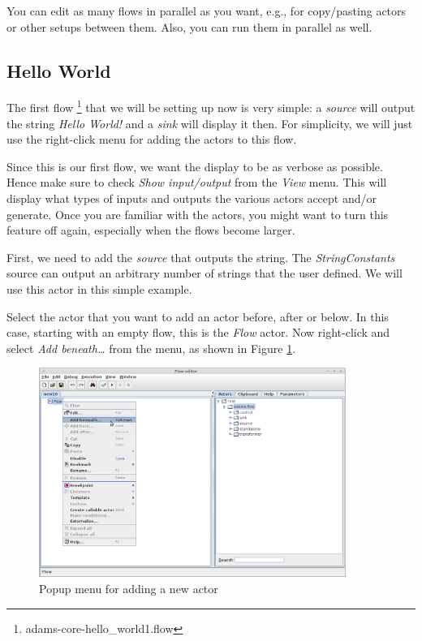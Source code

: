 You can edit as many flows in parallel as you want, e.g., for copy/pasting
actors or other setups between them. Also, you can run them in parallel as well.

\clearpage
\subsection{Hello World}
The first flow \footnote{adams-core-hello\_world1.flow} that we will be setting
up now is very simple: a \textit{source} will output the string \textit{Hello World!} and a \textit{sink} will display
it then. For simplicity, we will just use the right-click menu for adding the
actors to this flow.

Since this is our first flow, we want the display to be as
verbose as possible. Hence make sure to check \textit{Show input/output} from
the \textit{View} menu. This will display what types of inputs and outputs the
various actors accept and/or generate. Once you are familiar with the actors,
you might want to turn this feature off again, especially when the flows become
larger.

First, we need to add the \textit{source} that outputs the string. The
\textit{StringConstants} source can output an arbitrary number of strings that
the user defined. We will use this actor in this simple example.

Select the actor that you want to add an actor before, after or
below. In this case, starting with an empty flow, this is the
\textit{Flow} actor. Now right-click and select \textit{Add beneath\ldots} from
the menu, as shown in Figure \ref{floweditor-helloworld-addactor1}.

\begin{figure}[htb]
  \centering
  \includegraphics[width=10.0cm]{images/floweditor-helloworld-addactor1.png}
  \caption{Popup menu for adding a new actor}
  \label{floweditor-helloworld-addactor1}
\end{figure}

